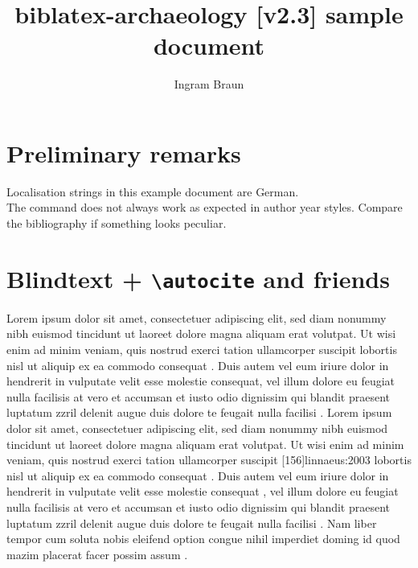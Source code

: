 \documentclass[a4paper,12pt,twoside]{scrartcl}
\title{biblatex-archaeology [v2.3] sample document}
\subtitle{\explhead}
\author{Ingram Braun}
\newcommand*{\Befehl}[1]{\texttt{\textbackslash#1}}
\newcommand{\exmplwarn}[1]{\textcolor{red}{\faExclamationTriangle} #1\\}
\begin{document}
\maketitle
\tableofcontents

\section{Preliminary remarks}

\exmplwarn{Localisation strings in this example document are German.}
    {\exmplwarn{The \detokenize{\fullcite} command does not always work as expected in author year styles. Compare the bibliography if something looks peculiar.}%
    }
    {}

\section{Blindtext + \Befehl{autocite} and friends}

Lorem ipsum dolor sit amet, consectetuer adipiscing elit\autocite[145--146]{todorova:et:al:1981}, sed diam nonummy nibh euismod tincidunt ut laoreet dolore magna aliquam erat volutpat\autocite[145--146]{todorova:et:al:1981}. Ut wisi enim ad minim veniam\autocite[3--9]{todorova:et:al:1981}, quis nostrud exerci tation ullamcorper suscipit lobortis nisl ut aliquip ex ea commodo consequat \autocite{auler:hiller:2015}. Duis autem vel eum iriure dolor in hendrerit in vulputate velit esse molestie consequat, vel illum dolore eu feugiat nulla facilisis at vero et accumsan et iusto odio dignissim qui blandit praesent luptatum zzril delenit augue duis dolore te feugait nulla facilisi \autocites[68]{auler:hiller:2011}[48]{auler:hiller:2015a}[159--187]{auler:hiller:2015}[40--41]{auler:hiller:2016}[15--23]{tacitus:1981}[19]{de:neck:yoder:1978}[69]{auler:hiller:2011}. Lorem ipsum dolor sit amet, consectetuer adipiscing elit, sed diam nonummy nibh euismod tincidunt ut laoreet dolore magna aliquam erat volutpat. Ut wisi enim ad minim veniam, quis nostrud exerci tation ullamcorper suscipit [156]{linnaeus:2003} lobortis nisl ut aliquip ex ea commodo consequat \autocite{kenmore}. Duis autem vel eum iriure dolor in hendrerit in vulputate velit esse molestie consequat \autocites[73--75]{mueller:f:1991}[105--108]{mueller:a:1991}[68--70]{mueller:h:1900}[61]{mueller:har:1988}, vel illum dolore eu feugiat nulla facilisis at vero et accumsan et iusto odio dignissim qui blandit praesent luptatum zzril delenit augue duis dolore te feugait nulla facilisi \autocite{kenmore}. Nam liber tempor cum soluta nobis eleifend option congue nihil imperdiet doming id quod mazim placerat facer possim assum \autocite[145--146]{todorova:et:al:1981}.
\end{document}
